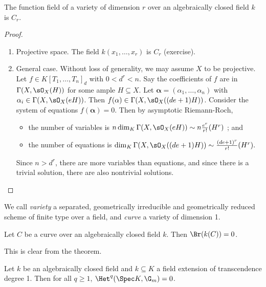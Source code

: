 \begin{thm}[Tsen]
The function field of a variety of dimension $r$ over an algebraically closed field $k$ is $C_r$.
\end{thm}

\begin{proof}
\begin{enumerate}[\it C{a}se 1.]
\item
Projective space. The field $k(x_1, \ldots, x_r)$ is $C_r$ (exercise).
\item
General case. Without loss of generality, we may assume $X$ to be projective. Let $f \in K[T_1, \dots, T_n]_d$ with $0 < d^r <n$. Say the coefficients of $f$ are in $\Gamma(X,\sO_X(H))$ for some ample $H \subseteq X$. Let $\mathbf{\alpha} = (\alpha_1, \dots, \alpha_n)$ with $\alpha_i \in \Gamma(X, \sO_X(eH))$. Then $f(\mathbf{\alpha}) \in \Gamma(X, \sO_X((de+1)H))$. Consider the system of equations $f(\mathbf{\alpha}) =0$. Then by asymptotic Riemann-Roch, 
\begin{itemize}
\item
the number of variables is $n\dim_K \Gamma(X,\sO_X(eH)) \sim n\frac{e^r}{r!} (H^r)$ ; and
\item
the number of equations is $\dim_K \Gamma(X,\sO_X((de+1)H)) \sim \frac{(de+1)^r}{r!} (H^r).$
\end{itemize}
Since $n> d^r$, there are more variables than equations, and since there is a trivial solution, there are also nontrivial solutions.
\end{enumerate}
\end{proof}

\begin{defi}
We call \emph{variety} a separated, geometrically irreducible and geometrically reduced scheme of finite type over a field, and  \emph{curve} a variety of dimension 1. 
\end{defi}

\begin{cor}
Let $C$ be a curve over an algebraically closed field $k$. Then $\Br(k(C)) = 0$.
\end{cor}

This is clear from the theorem.

\begin{cor} \label{cor:HqGmKvanishes}
Let $k$ be an algebraically closed field and $k \subseteq K$ a field extension of transcendence degree 1. Then for all $q \geqslant 1$, $\Het^q(\Spec K, \G_m) = 0$.
\end{cor}

